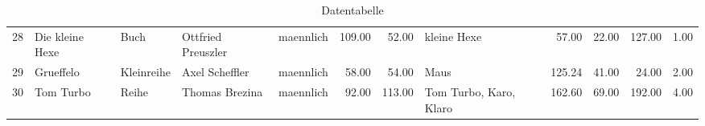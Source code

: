 \begin{table}
\begin{center}
{\begin{tabular}{rllllrrlrrrr}
  28 & Die kleine Hexe                                                                                                                                                                                                                                                 & Buch & Ottfried Preuszler                                                                                                                                                                                                                                              & maennlich & 109.00 & 52.00 & kleine Hexe                                                                                                                                                                                                                                                     & 57.00 & 22.00 & 127.00 & 1.00 \\ 
  29 & Grueffelo                                                                                                                                                                                                                                                       & Kleinreihe & Axel Scheffler                                                                                                                                                                                                                                                  & maennlich & 58.00 & 54.00 & Maus                                                                                                                                                                                                                                                            & 125.24 & 41.00 & 24.00 & 2.00 \\ 
  30 & Tom Turbo                                                                                                                                                                                                                                                       & Reihe & Thomas Brezina                                                                                                                                                                                                                                                  & maennlich & 92.00 & 113.00 & Tom Turbo, Karo, Klaro                                                                                                                                                                                                                                          & 162.60 & 69.00 & 192.00 & 4.00 \\ 
   \hline
\end{tabular}
}
\caption{Datentabelle}
\label{merkmale}
\end{center}
\end{table}%
